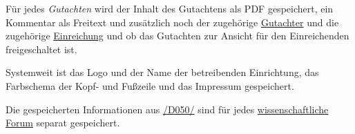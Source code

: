 \begin{description}
	 Für jedes \emph{Gutachten} wird der Inhalt des Gutachtens als PDF gespeichert, ein Kommentar als Freitext und zusätzlich noch der zugehörige \hyperref[funkt:Gutachter]{Gutachter} und die zugehörige \hyperref[d025]{Einreichung} und ob das Gutachten zur Ansicht für den Einreichenden freigeschaltet ist.

	 Systemweit ist das Logo und der Name der betreibenden Einrichtung, das Farbschema der Kopf- und Fußzeile und das Impressum gespeichert.

	 Die gespeicherten Informationen aus \hyperref[d050]{/D050/} sind für jedes \hyperref[d030]{wissenschaftliche Forum} separat gespeichert.
\end{description}